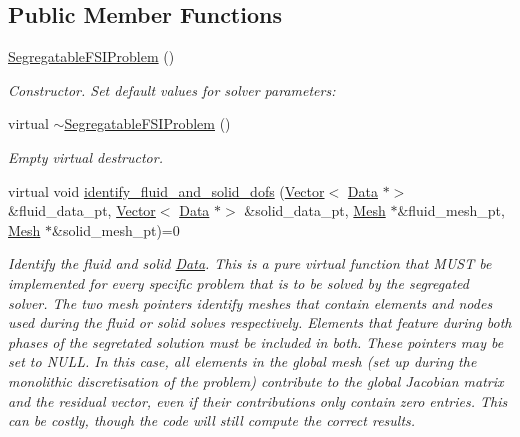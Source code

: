 \subsection*{Public Member Functions}
\begin{DoxyCompactItemize}
\item 
\hyperlink{classoomph_1_1SegregatableFSIProblem_aabbe220c15e7a348a28d54be805ca8d8}{Segregatable\+F\+S\+I\+Problem} ()
\begin{DoxyCompactList}\small\item\em Constructor. Set default values for solver parameters\+: \end{DoxyCompactList}\item 
virtual \hyperlink{classoomph_1_1SegregatableFSIProblem_aa3c69a4078b02d251e4532e73d5820aa}{$\sim$\+Segregatable\+F\+S\+I\+Problem} ()
\begin{DoxyCompactList}\small\item\em Empty virtual destructor. \end{DoxyCompactList}\item 
virtual void \hyperlink{classoomph_1_1SegregatableFSIProblem_a60f719990547949019c8645a4b3a6c6e}{identify\+\_\+fluid\+\_\+and\+\_\+solid\+\_\+dofs} (\hyperlink{classoomph_1_1Vector}{Vector}$<$ \hyperlink{classoomph_1_1Data}{Data} $\ast$$>$ \&fluid\+\_\+data\+\_\+pt, \hyperlink{classoomph_1_1Vector}{Vector}$<$ \hyperlink{classoomph_1_1Data}{Data} $\ast$$>$ \&solid\+\_\+data\+\_\+pt, \hyperlink{classoomph_1_1Mesh}{Mesh} $\ast$\&fluid\+\_\+mesh\+\_\+pt, \hyperlink{classoomph_1_1Mesh}{Mesh} $\ast$\&solid\+\_\+mesh\+\_\+pt)=0
\begin{DoxyCompactList}\small\item\em Identify the fluid and solid \hyperlink{classoomph_1_1Data}{Data}. This is a pure virtual function that M\+U\+ST be implemented for every specific problem that is to be solved by the segregated solver. The two mesh pointers identify meshes that contain elements and nodes used during the fluid or solid solves respectively. Elements that feature during both phases of the segretated solution must be included in both. These pointers may be set to N\+U\+LL. In this case, all elements in the global mesh (set up during the monolithic discretisation of the problem) contribute to the global Jacobian matrix and the residual vector, even if their contributions only contain zero entries. This can be costly, though the code will still compute the correct results. \end{DoxyCompactList}\item 

\end{DoxyCompactItemize}
